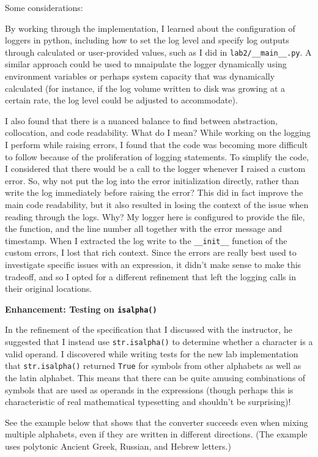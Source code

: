 \documentclass[10pt,letterpaper,final]{report}
\begin{document}
\noindent Some considerations:

By working through the implementation, I learned about the configuration of loggers in python, including how to set the log level and specify log outputs through calculated or user-provided values, such as I did in \texttt{lab2/__main__.py}. A similar approach could be used to mnaipulate the logger dynamically using environment variables or perhaps system capacity that was dynamically calculated (for instance, if the log volume written to disk was growing at a certain rate, the log level could be adjusted to accommodate).

I also found that there is a nuanced balance to find between abstraction, collocation, and code readability. What do I mean? While working on the logging I perform while raising errors, I found that the code was becoming more difficult to follow because of the proliferation of logging statements. To simplify the code, I considered that there would be a call to the logger whenever I raised a custom error. So, why not put the log into the error initialization directly, rather than write the log immediately before raising the error? This did in fact improve the main code readability, but it also resulted in losing the context of the issue when reading through the logs. Why? My logger here is configured to provide the file, the function, and the line number all together with the error message and timestamp. When I extracted the log write to the \texttt{__init__} function of the custom errors, I lost that rich context. Since the errors are really best used to investigate specific issues with an expression, it didn't make sense to make this tradeoff, and so I opted for a different refinement that left the logging calls in their original locations.

\medskip
\noindent \textbf{Enhancement: Testing on \texttt{isalpha()}}
\medskip

In the refinement of the specification that I discussed with the instructor, he suggested that I instead use \texttt{str.isalpha()} to determine whether a character is a valid operand. I discovered while writing tests for the new lab implementation that \texttt{str.isalpha()} returned \texttt{True} for symbols from other alphabets as well as the latin alphabet. This means that there can be quite amusing combinations of symbols that are used as operands in the expressions (though perhaps this is characteristic of real mathematical typesetting and shouldn't be surprising)!

See the example below that shows that the converter succeeds even when mixing multiple alphabets, even if they are written in different directions. (The example uses polytonic Ancient Greek, Russian, and Hebrew letters.)
\end{document}

